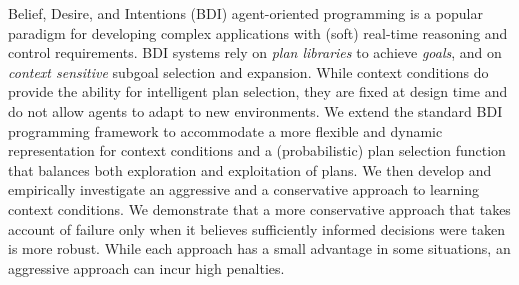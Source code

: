 Belief, Desire, and Intentions (BDI) agent-oriented programming is a popular 
paradigm for developing complex applications with (soft) real-time reasoning
and control requirements. BDI systems rely on \emph{plan libraries} to achieve
\emph{goals}, and on \emph{context sensitive} subgoal selection and
expansion. 
%
While context conditions do provide the ability for intelligent plan
selection, they are fixed at design time and do not allow agents to
adapt to new environments.
%
We extend the standard BDI programming framework to accommodate a more
flexible and dynamic representation for context conditions and a
(probabilistic) plan selection function that balances both exploration
and exploitation of plans. 
%
We then develop and empirically investigate an aggressive and
a conservative approach to learning context conditions. We demonstrate
that a more conservative
approach that takes account of failure only when it believes
sufficiently informed decisions were taken is more robust.
While each approach has a small advantage in some situations, an
aggressive approach can incur high penalties.

